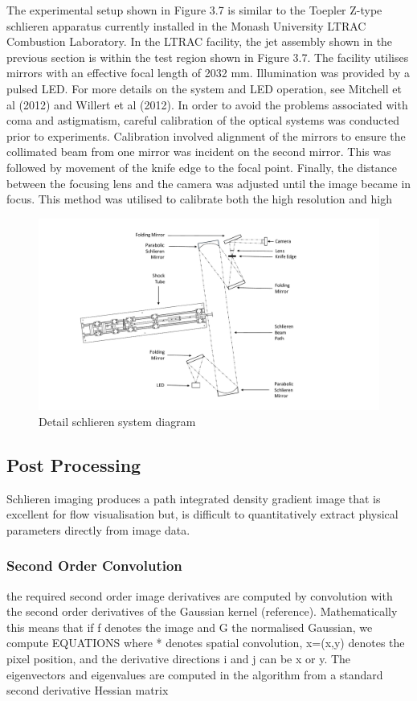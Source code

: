 The experimental setup shown in Figure 3.7 is similar to the Toepler Z-type schlieren
apparatus currently installed in the Monash University LTRAC Combustion Laboratory.
In the LTRAC facility, the jet assembly shown in the previous section is within the test
region shown in Figure 3.7. The facility utilises mirrors with an effective focal length of
2032 mm. Illumination was provided by a pulsed LED. For more details on the system and
LED operation, see Mitchell et al (2012) and Willert et al (2012).
In order to avoid the problems associated with coma and astigmatism, careful calibration
of the optical systems was conducted prior to experiments. Calibration involved
alignment of the mirrors to ensure the collimated beam from one mirror was incident on
the second mirror. This was followed by movement of the knife edge to the focal point.
Finally, the distance between the focusing lens and the camera was adjusted until the image
became in focus. This method was utilised to calibrate both the high resolution and high

\begin{figure}[H] 
	\centering
	\includegraphics[width=1\textwidth]{schlieren_diagram.pdf} 
	\caption{Detail schlieren system diagram}
	\label{fig:schlieren}
\end{figure}

\subsection{Post Processing}
Schlieren imaging produces a path integrated density gradient image that is excellent for flow visualisation but, is difficult to quantitatively extract physical parameters directly from image data. 

\subsubsection{Second Order Convolution}
the required second order image derivatives are computed by convolution with the second order derivatives of the Gaussian kernel (reference). Mathematically this means that if f denotes the image and G the normalised Gaussian, we compute
EQUATIONS
where * denotes spatial convolution, x=(x,y) denotes the pixel position, and the derivative directions i and j can be x or y. The eigenvectors and eigenvalues are computed in the algorithm from a standard second derivative Hessian matrix 

